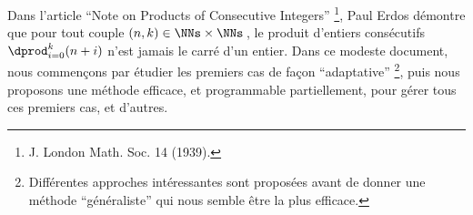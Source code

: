 Dans l'article \enquote{Note on Products of Consecutive Integers}
\footnote{
	J. London Math. Soc. 14 (1939).
},
Paul Erdos démontre que pour tout couple $(n, k) \in \NNs \times \NNs$\,, le produit d'entiers consécutifs $\dprod_{i = 0}^{k} (n + i)$ n'est jamais le carré d'un entier. Dans ce modeste document, nous commençons par étudier les premiers cas de façon \enquote{adaptative}
\footnote{
	Différentes approches intéressantes sont proposées avant de donner une méthode \enquote{généraliste} qui nous semble être la plus efficace.
},
puis nous proposons une méthode efficace, et programmable partiellement, pour gérer tous ces premiers cas, et d'autres. 